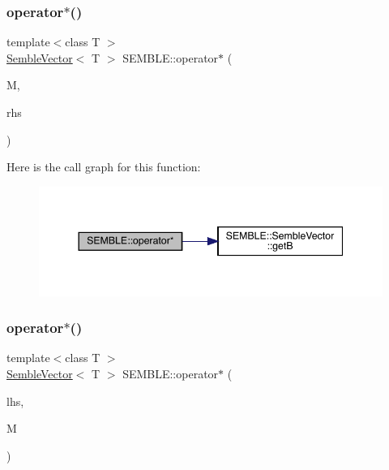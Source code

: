 \subsubsection{\texorpdfstring{operator$\ast$()}{operator*()}\hspace{0.1cm}{\footnotesize\ttfamily [10/20]}}
{\footnotesize\ttfamily template$<$class T $>$ \\
\mbox{\hyperlink{structSEMBLE_1_1SembleVector}{Semble\+Vector}}$<$ T $>$ S\+E\+M\+B\+L\+E\+::operator$\ast$ (\begin{DoxyParamCaption}\item[{const itpp\+::\+Mat$<$ T $>$ \&}]{M,  }\item[{const \mbox{\hyperlink{structSEMBLE_1_1SembleVector}{Semble\+Vector}}$<$ T $>$ \&}]{rhs }\end{DoxyParamCaption})}

Here is the call graph for this function\+:
\nopagebreak
\begin{figure}[H]
\begin{center}
\leavevmode
\includegraphics[width=344pt]{d7/dfd/namespaceSEMBLE_a23db5b999663ed20c851efe625716b04_cgraph}
\end{center}
\end{figure}
\mbox{\label{namespaceSEMBLE_a6edaf00d285c6d4509505f30c27df7ec}} 
\subsubsection{\texorpdfstring{operator$\ast$()}{operator*()}\hspace{0.1cm}{\footnotesize\ttfamily [11/20]}}
{\footnotesize\ttfamily template$<$class T $>$ \\
\mbox{\hyperlink{structSEMBLE_1_1SembleVector}{Semble\+Vector}}$<$ T $>$ S\+E\+M\+B\+L\+E\+::operator$\ast$ (\begin{DoxyParamCaption}\item[{const \mbox{\hyperlink{structSEMBLE_1_1SembleVector}{Semble\+Vector}}$<$ T $>$ \&}]{lhs,  }\item[{const itpp\+::\+Mat$<$ T $>$ \&}]{M }\end{DoxyParamCaption})}

